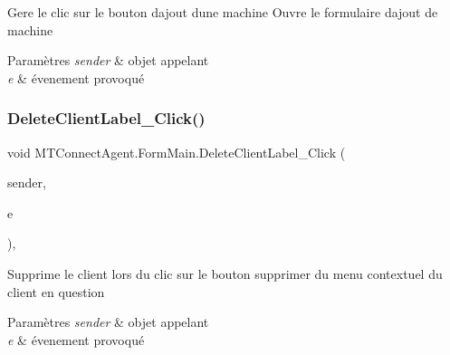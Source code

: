 Gere le clic sur le bouton d\textquotesingle{}ajout d\textquotesingle{}une machine Ouvre le formulaire d\textquotesingle{}ajout de machine 


\begin{DoxyParams}{Paramètres}
{\em sender} & objet appelant\\
\hline
{\em e} & évenement provoqué\\
\hline
\end{DoxyParams}
\mbox{\label{class_m_t_connect_agent_1_1_form_main_a63b6bc05b458da02b80617365163d10d}} 
\subsubsection{\texorpdfstring{Delete\+Client\+Label\+\_\+\+Click()}{DeleteClientLabel\_Click()}}
{\footnotesize\ttfamily void M\+T\+Connect\+Agent.\+Form\+Main.\+Delete\+Client\+Label\+\_\+\+Click (\begin{DoxyParamCaption}\item[{object}]{sender,  }\item[{Event\+Args}]{e }\end{DoxyParamCaption})\hspace{0.3cm}{\ttfamily [inline]}, {\ttfamily [private]}}



Supprime le client lors du clic sur le bouton supprimer du menu contextuel du client en question 


\begin{DoxyParams}{Paramètres}
{\em sender} & objet appelant\\
\hline
{\em e} & évenement provoqué\\
\hline
\end{DoxyParams}
\mbox{\label{class_m_t_connect_agent_1_1_form_main_a326e8aba114dece871aa510ce1aa495e}} 
